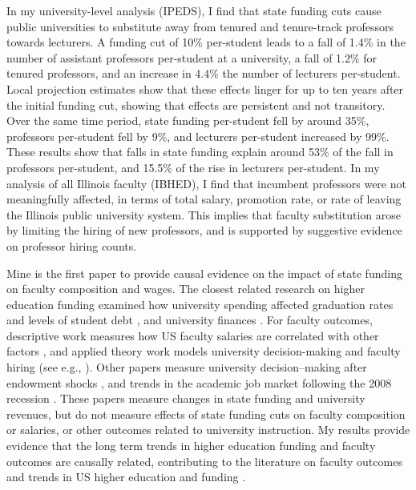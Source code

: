 In my university-level analysis (IPEDS), I find that state funding cuts cause public universities to substitute away from tenured and tenure-track professors towards lecturers.
A funding cut of 10\% per-student leads to a fall of 1.4\% in the number of assistant professors per-student at a university, a fall of 1.2\% for tenured professors, and an increase in 4.4\% the number of lecturers per-student.
Local projection estimates show that these effects linger for up to ten years after the initial funding cut, showing that effects are persistent and not transitory.
Over the same time period, state funding per-student fell by around 35\%, professors per-student fell by 9\%, and lecturers per-student increased by 99\%.
These results show that falls in state funding explain around 53\% of the fall in professors per-student,
and 15.5\% of the rise in lecturers per-student.
In my analysis of all Illinois faculty (IBHED), I find that incumbent professors were not meaningfully affected, in terms of total salary, promotion rate, or rate of leaving the Illinois public university system.
This implies that faculty substitution arose by limiting the hiring of new professors, and is supported by suggestive evidence on professor hiring counts.

Mine is the first paper to provide causal evidence on the impact of state funding on faculty composition and wages.
The closest related research on higher education funding examined how university spending affected graduation rates and levels of student debt \citep{NBERw23736,NBERw27885}, and university finances \citep{miller2022making,bound2019public,brown2014endowment}.
For faculty outcomes, descriptive work measures how US faculty salaries are correlated with other factors \citep{hilmer2020labor}, and applied theory work models university decision-making and faculty hiring (see e.g., \citealt{abe2015implications,johnson2009jep,NBERc13879}).
Other papers measure university decision--making after endowment shocks \citep{brown2014endowment}, and trends in the academic job market following the 2008 recession \citep{turner2014impact}.
These papers measure changes in state funding and university revenues, but do not measure effects of state funding cuts on faculty composition or salaries, or other outcomes related to university instruction.
My results provide evidence that the long term trends in higher education funding and faculty outcomes are causally related, contributing to the literature on faculty outcomes \citep{ehrenberg2003studying} and trends in US higher education and funding \citep{hoxby2009changing,ehrenberg2012american}.

